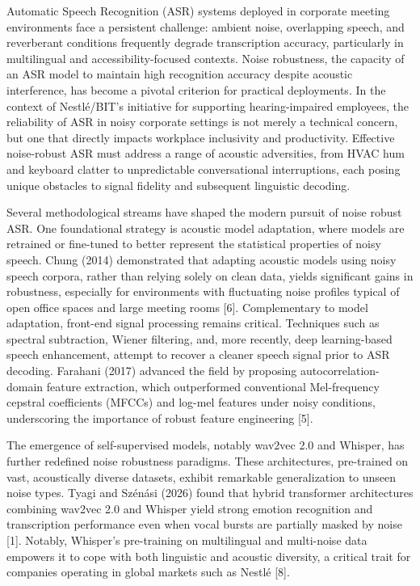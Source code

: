 \documentclass[12pt,a4paper]{article}
\begin{document}
Automatic Speech Recognition (ASR) systems deployed in corporate meeting environments face a persistent challenge: ambient noise, overlapping speech, and reverberant conditions frequently degrade transcription accuracy, particularly in multilingual and accessibility-focused contexts. Noise robustness, the capacity of an ASR model to maintain high recognition accuracy despite acoustic interference, has become a pivotal criterion for practical deployments. In the context of Nestlé/BIT’s initiative for supporting hearing-impaired employees, the reliability of ASR in noisy corporate settings is not merely a technical concern, but one that directly impacts workplace inclusivity and productivity. Effective noise-robust ASR must address a range of acoustic adversities, from HVAC hum and keyboard clatter to unpredictable conversational interruptions, each posing unique obstacles to signal fidelity and subsequent linguistic decoding.


Several methodological streams have shaped the modern pursuit of noise robust ASR. One foundational strategy is acoustic model adaptation, where models are retrained or fine-tuned to better represent the statistical properties of noisy speech. Chung (2014) demonstrated that adapting acoustic models using noisy speech corpora, rather than relying solely on clean data, yields significant gains in robustness, especially for environments with fluctuating noise profiles typical of open office spaces and large meeting rooms [6]. Complementary to model adaptation, front-end signal processing remains critical. Techniques such as spectral subtraction, Wiener filtering, and, more recently, deep learning-based speech enhancement, attempt to recover a cleaner speech signal prior to ASR decoding. Farahani (2017) advanced the field by proposing autocorrelation-domain feature extraction, which outperformed conventional Mel-frequency cepstral coefficients (MFCCs) and log-mel features under noisy conditions, underscoring the importance of robust feature engineering [5].


The emergence of self-supervised models, notably wav2vec 2.0 and Whisper, has further redefined noise robustness paradigms. These architectures, pre-trained on vast, acoustically diverse datasets, exhibit remarkable generalization to unseen noise types. Tyagi and Szénási (2026) found that hybrid transformer architectures combining wav2vec 2.0 and Whisper yield strong emotion recognition and transcription performance even when vocal bursts are partially masked by noise [1]. Notably, Whisper’s pre-training on multilingual and multi-noise data empowers it to cope with both linguistic and acoustic diversity, a critical trait for companies operating in global markets such as Nestlé [8].
\end{document}

